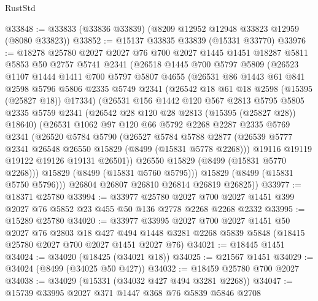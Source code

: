 \begin{lexlean}{RustStd}
\begin{coremodule}
@33848 := @33833 (@33836 @33839) (@8209 @12952 @12948 @33823 @12959 (@8080 @33823))
@33852 := @15137 @33835 @33839 (@15331 @33770)
@33976 := @18278
    @25780
    @2027
    @2027
    @76
    @700
    @2027
    @1445
    @1451
    @18287
    @5811
    @5853
    @50
    @2757
    @5741
    @2341
    (@26518
      @1445
      @700
      @5797
      @5809
      (@26523
        @1107
        @1444
        @1411
        @700
        @5797
        @5807
        @4655
        (@26531
          @86
          @1443
          @61
          @841
          @2598
          @5796
          @5806
          @2335
          @5749
          @2341
          (@26542 @18 @61 @18 @2598 (@15395 (@25827 @18)) @17334)
          (@26531
            @156
            @1442
            @120
            @567
            @2813
            @5795
            @5805
            @2335
            @5759
            @2341
            (@26542 @28 @120 @28 @2813 (@15395 (@25827 @28)) @18640)
            (@26531
              @1062
              @97
              @120
              @66
              @5792
              @2268
              @2287
              @2335
              @5769
              @2341
              (@26520
                @5784
                @5790
                (@26527
                  @5784
                  @5788
                  @2877
                  (@26539 @5777 @2341 @26548 @26550 @15829 (@8499 (@15831 @5778 @2268)))
                  @19116
                  @19119
                  @19122
                  @19126
                  @19131
                  @26501))
              @26550
              @15829
              (@8499 (@15831 @5770 @2268)))
            @15829
            (@8499 (@15831 @5760 @5795)))
          @15829
          (@8499 (@15831 @5750 @5796)))
        @26804
        @26807
        @26810
        @26814
        @26819
        @26825))
@33977 := @18371 @25780
@33994 := @33977
    @25780
    @2027
    @700
    @2027
    @1451
    @399
    @2027
    @76
    @5852
    @23
    @455
    @50
    @136
    @2778
    @2268
    @2268
    @2332
@33995 := @15289 @25780
@34020 := @33977
    @33995
    @2027
    @700
    @2027
    @1451
    @50
    @2027
    @76
    @2803
    @18
    @427
    @494
    @1448
    @3281
    @2268
    @5839
    @5848
    (@18415 @25780 @2027 @700 @2027 @1451 @2027 @76)
@34021 := @18445 @1451
@34024 := @34020 (@18425 (@34021 @18))
@34025 := @21567 @1451
@34029 := @34024 (@8499 (@34025 @50 @427))
@34032 := @18459 @25780 @700 @2027
@34038 := @34029 (@15331 (@34032 @427 @494 @3281 @2268))
@34047 := @15739 @33995 @2027 @371 @1447 @368 @76 @5839 @5846 @2708

\end{coremodule}
\end{lexlean}
